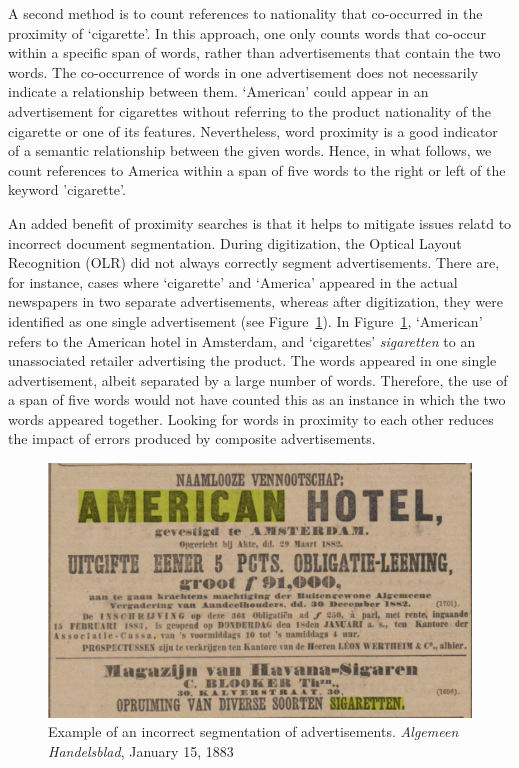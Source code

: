 \documentclass[USenglish]{article}
\begin{document}
A second method is to count references to nationality that co-occurred in the proximity of `cigarette'. In this approach, one only counts words that co-occur within a specific span of words, rather than advertisements that contain the two words. The co-occurrence of words in one advertisement does not necessarily indicate a relationship between them. `American' could appear in an advertisement for cigarettes without referring to the product nationality of the cigarette or one of its features. Nevertheless, word proximity is a good indicator of a semantic relationship between the given words. Hence, in what follows, we count references to America within a span of five words to the right or left of the keyword 'cigarette'. 

An added benefit of proximity searches is that it helps to mitigate issues relatd to incorrect document segmentation. During digitization, the Optical Layout Recognition (OLR) did not always correctly segment advertisements. There are, for instance, cases where `cigarette' and `America' appeared in the actual newspapers in two separate advertisements, whereas after digitization, they were identified as one single advertisement (see Figure~\ref{fig:segmentation}). In Figure~\ref{fig:segmentation}, `American' refers to the American hotel in Amsterdam, and `cigarettes' \textit{sigaretten} to an unassociated retailer advertising the product. The words appeared in one single advertisement, albeit separated by a large number of words. Therefore, the use of a span of five words would not have counted this as an instance in which the two words appeared together. Looking for words in proximity to each other reduces the impact of errors produced by composite advertisements.

\begin{figure}%
  \centering
  \includegraphics[width=.7\textwidth]{figures/segmentation_error}%
  \caption{Example of an incorrect segmentation of advertisements. \textit{Algemeen Handelsblad}, January 15, 1883}%
  \label{fig:segmentation}%
\end{figure}
\end{document}
